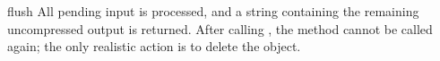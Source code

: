 \begin{funcdesc}{flush}{}
All pending input is processed, and a string containing the remaining
uncompressed output is returned.  After calling , the
 method cannot be called again; the only realistic
action is to delete the object.
\end{funcdesc}

\begin{seealso}
\end{seealso}


